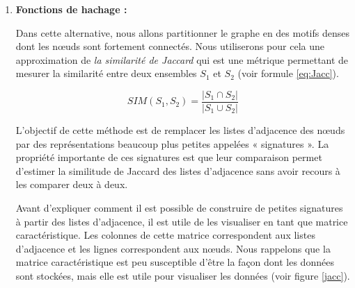 \documentclass[a4paper,oneside,12pt]{report}
\theoremstyle{definition}
\begin{document}
\begin{enumerate}
\begin{figure}[H]
 \end{figure}





\item \textbf{Fonctions de hachage :}

Dans cette alternative, nous allons partitionner le graphe en des motifs denses dont les nœuds sont fortement connectés. Nous utiliserons pour cela une approximation de \textit{la similarité de Jaccard} qui est une métrique permettant de mesurer la similarité entre deux ensembles $S_1$ et $S_2$ (voir formule \ref{eq:Jacc}). 

\begin{equation} \label{eq:Jacc}
SIM(S_1,S_2)=\frac{|S_1 \cap S_2|}{|S_1 \cup S_2|}
\end{equation}


L'objectif de cette méthode est de remplacer les listes d'adjacence des nœuds par des représentations beaucoup plus petites appelées « signatures ». La propriété importante de ces signatures est que leur comparaison permet d'estimer la similitude de Jaccard des listes d'adjacence sans avoir recours à les comparer deux à deux. 

Avant d'expliquer comment il est possible de construire de petites signatures à partir des listes d'adjacence, il est utile de les visualiser en tant que matrice caractéristique. Les colonnes de cette matrice correspondent aux listes d'adjacence et les lignes correspondent aux nœuds. Nous rappelons que la matrice caractéristique est peu susceptible d'être la façon dont les données sont stockées, mais elle est utile pour visualiser les données (voir figure \ref{jacc}). 



\end{enumerate}
\end{document}
